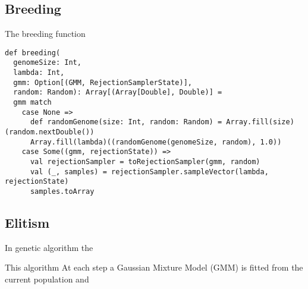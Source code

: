 \documentclass[10pt,a4paper]{article}
\theoremstyle{definition}
\theoremstyle{remark}
\begin{document}
\subsection{Breeding}

The breeding function 

\begin{lstlisting}[caption={Breeding},label={lst:breeding}]
def breeding(
  genomeSize: Int,
  lambda: Int,
  gmm: Option[(GMM, RejectionSamplerState)],
  random: Random): Array[(Array[Double], Double)] =
  gmm match
    case None =>
      def randomGenome(size: Int, random: Random) = Array.fill(size)(random.nextDouble())
      Array.fill(lambda)((randomGenome(genomeSize, random), 1.0))
    case Some((gmm, rejectionState)) =>
      val rejectionSampler = toRejectionSampler(gmm, random)
      val (_, samples) = rejectionSampler.sampleVector(lambda, rejectionState)
      samples.toArray
\end{lstlisting}


\subsection{Elitism}

In genetic algorithm the 


 This algorithm At each step a Gaussian Mixture Model (GMM) is fitted from the current population and
\end{document}
